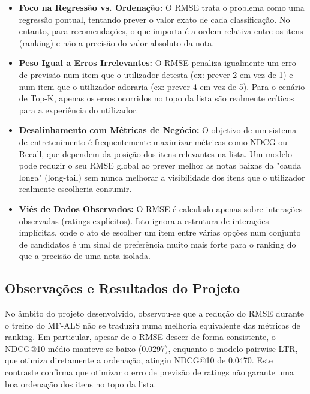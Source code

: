 \begin{itemize}
    \item \textbf{Foco na Regressão vs. Ordenação:} O RMSE trata o problema como uma regressão pontual, tentando prever o valor exato de cada classificação. No entanto, para recomendações, o que importa é a ordem relativa entre os itens (ranking) e não a precisão do valor absoluto da nota.
    
    \item \textbf{Peso Igual a Erros Irrelevantes:} O RMSE penaliza igualmente um erro de previsão num item que o utilizador detesta (ex: prever 2 em vez de 1) e num item que o utilizador adoraria (ex: prever 4 em vez de 5). Para o cenário de Top-K, apenas os erros ocorridos no topo da lista são realmente críticos para a experiência do utilizador.
    
    \item \textbf{Desalinhamento com Métricas de Negócio:} O objetivo de um sistema de entretenimento é frequentemente maximizar métricas como NDCG ou Recall, que dependem da posição dos itens relevantes na lista. Um modelo pode reduzir o seu RMSE global ao prever melhor as notas baixas da "cauda longa" (long-tail) sem nunca melhorar a visibilidade dos itens que o utilizador realmente escolheria consumir.
    
    \item \textbf{Viés de Dados Observados:} O RMSE é calculado apenas sobre interações observadas (ratings explícitos). Isto ignora a estrutura de interações implícitas, onde o ato de escolher um item entre várias opções num conjunto de candidatos é um sinal de preferência muito mais forte para o ranking do que a precisão de uma nota isolada.
\end{itemize}



\subsection*{Observações e Resultados do Projeto}
No âmbito do projeto desenvolvido, observou-se que a redução do RMSE durante o treino do MF-ALS não se traduziu numa melhoria equivalente das métricas de ranking. Em particular, apesar de o RMSE descer de forma consistente, o NDCG@10 médio manteve-se baixo (0.0297), enquanto o modelo pairwise LTR, que otimiza diretamente a ordenação, atingiu NDCG@10 de 0.0470. Este contraste confirma que otimizar o erro de previsão de ratings não garante uma boa ordenação dos itens no topo da lista.

